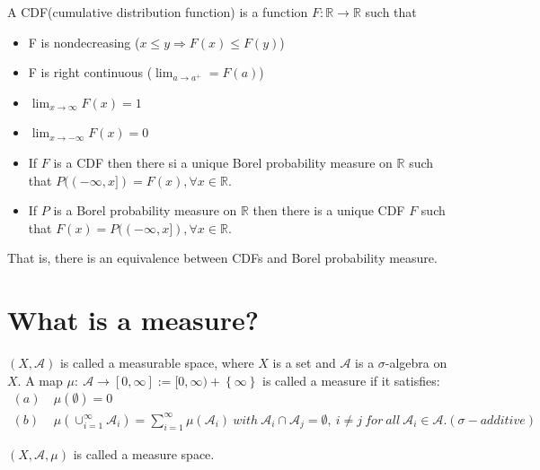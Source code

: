 \documentclass[../../note.tex]{subfiles}
\begin{document}
\begin{definition}
   A CDF(cumulative distribution function) is a function $F: \mathbb{R} \rightarrow \mathbb{R}$ such that
   \begin{itemize}
    \item F is nondecreasing ($x \leq y \Longrightarrow F(x) \leq F(y)$)
    \item F is right continuous ($\lim_{a \rightarrow a^{+}} = F(a)$) 
    \item $\lim_{x \rightarrow \infty} F(x) = 1$ 
    \item $\lim_{x \rightarrow -\infty} F(x) = 0$
   \end{itemize} 
\end{definition}

\begin{theorem}
    \begin{itemize}
        \item If $F$ is a CDF then there si a unique Borel probability measure on $\mathbb{R}$ such that $P((-\infty, x]) = F(x), \forall x \in \mathbb{R}$.
        \item If $P$ is a Borel probability measure on $\mathbb{R}$ then there is a unique CDF $F$ such that $F(x) = P((-\infty, x]), \forall x \in \mathbb{R}$. 
    \end{itemize}
    That is, there is an equivalence between CDFs and Borel probability measure.
\end{theorem}

\section{What is a measure?}
\begin{definition}[Measure]
    $(X, \mathcal{A})$ is called a measurable space, where $X$ is a set and $\mathcal{A}$ is a $\sigma$-algebra on $X$. A map $\mu:~\mathcal{A} \rightarrow [0,\infty]:= [0,\infty)+\left\{\infty\right\}$ is called a measure if it satisfies:
    \begin{align}
        (a)~& \mu(\emptyset) = 0 \\
        (b)~& \mu(\cup_{i=1}^{\infty}\mathcal{A}_i) = \sum_{i=1}^{\infty} \mu(\mathcal{A}_i)~with~\mathcal{A}_i \cap \mathcal{A}_j = \emptyset,~i \neq j~for~all~\mathcal{A}_i \in \mathcal{A}. (\sigma-additive) 
    \end{align}
\end{definition}

\begin{definition}
    $(X,\mathcal{A},\mu)$ is called a measure space.
\end{definition}
\end{document}
